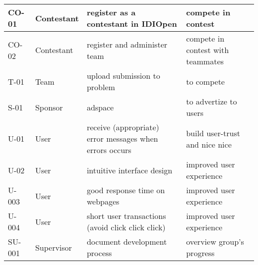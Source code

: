 \begin{tabular}{|l|p{1.5cm}|p{4.0cm}|p{3.5cm}|}
\hline
CO-01&Contestant&register as a contestant in IDIOpen&compete in contest\\
\hline
CO-02&Contestant&register and administer team&compete in contest with teammates\\
\hline
T-01&Team&upload submission to problem&to compete\\
\hline
S-01&Sponsor&adspace&to advertize to users\\
\hline
U-01&User&receive (appropriate) error messages when errors occurs&build user-trust and nice nice\\
\hline
U-02&User&intuitive interface design&improved user experience\\
\hline
U-003&User&good response time on webpages&improved user experience\\
\hline
U-004&User&short user transactions (avoid click click click)&improved user experience\\
\hline
SU-001&Supervisor&document development process&overview group's progress\\
\hline
\end{tabular}

